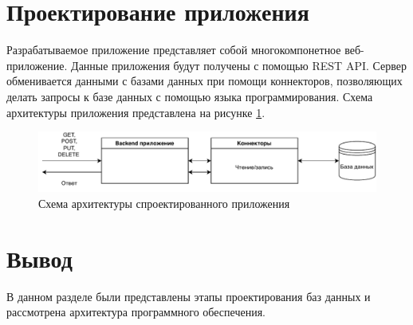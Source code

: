 \section{Проектирование приложения}
Разрабатываемое приложение представляет собой многокомпонетное веб-приложение. Данные приложения будут получены с помощью REST API. Сервер обменивается данными с базами данных при помощи коннекторов, позволяющих делать запросы к базе данных с помощью  языка программирования. Схема архитектуры приложения представлена на рисунке \ref*{img:arch}.

\begin{figure}[h!]
	\begin{center}
		\includegraphics[scale=0.8]{img/architecture.pdf}
	\end{center}
	\captionsetup{justification=centering}
	\caption{Схема архитектуры спроектированного приложения}
	\label{img:arch}
\end{figure}

\section*{Вывод}

В данном разделе были представлены этапы проектирования баз данных и рассмотрена архитектура программного обеспечения.
